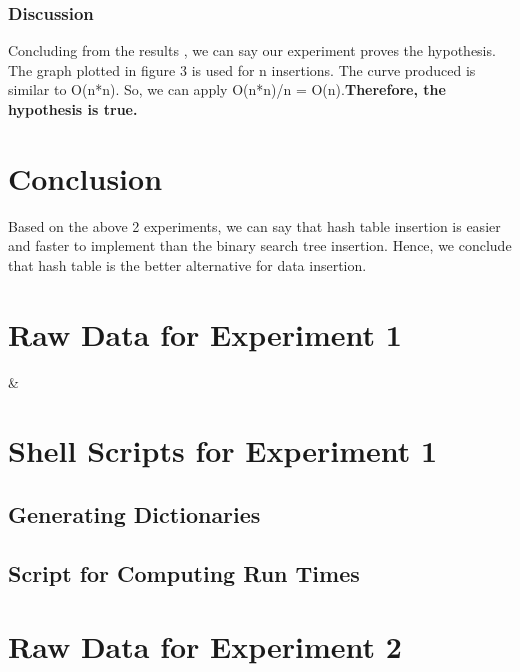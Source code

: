 \documentclass[a4]{article}
\begin{document}
\subsubsection{Discussion}
Concluding from the results , we can say our experiment proves the hypothesis. The graph plotted in figure 3 is used for n insertions. The curve produced is similar to O(n*n). So, we can apply O(n*n)/n = O(n).{\bf Therefore, the hypothesis is true.} 
\\


\section{Conclusion}
Based on the above 2 experiments, we can say that hash table insertion is easier and faster to implement than the binary search tree insertion. Hence, we conclude that hash table is the better alternative for data insertion.


\appendix
\section{Raw Data for Experiment 1}
\label{app:data}

%
{\csvcoli & \csvcolii}

\section{Shell Scripts for Experiment 1}
\label{app:shell_scripts}
\subsection{Generating Dictionaries}


\subsection{Script for Computing Run Times}


\section{Raw Data for Experiment 2}
\label{app:data2}
\end{document}
